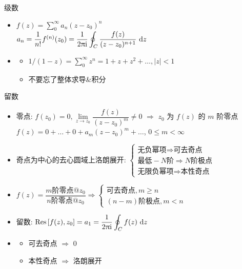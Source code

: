 \documentclass[landscape,a4paper]{ctexart}
\begin{document}
\begin{cheatsheetcolumns}
\begin{card}{级数}
\begin{itemize}
\begin{itemize}
					$\lambda=\lim\limits_{n\to\infty}\dfrac{\left|a_{n+1}\right|}{\left|a_n\right|},\sqrt[n]{a_n};R=\dfrac{1}{\lambda}$
					\item 若为隔项级数 $\sum a_nz^{kn+b}$\\
					$R=\sqrt[k]{R'}$, $R'$ 是对 $a_n$ 使用一般判别法得到的收敛半径
				\end{itemize}
				\item $f(z)=\sum_{0}^{\infty}a_n(z-z_0)^n$\\
				$a_n=\dfrac{1}{n!}f^{(n)}(z_0)=\dfrac{1}{2\uppi\ii}\displaystyle\oint_C\dfrac{f(z)}{(z-z_0)^{n+1}}\,\odif{z}$
				\item 
				\begin{itemize}
					\item $1/(1-z)=\sum_0^\infty z^n=1+z+z^2+\dots,\left|z\right|<1$
					\item 不要忘了整体求导\&积分
				\end{itemize}
			\end{itemize}
		\end{card}
		\begin{card}{留数}
			\begin{itemize}
				\item 零点: $f(z_0)=0,\lim\limits_{z\to z_0}\dfrac{f(z)}{(z-z_0)^m}\neq0$ $\Rightarrow$ $z_0$ 为 $f(z)$ 的 $m$ 阶零点\\
				$f(z)=0+\dots+0+a_m(z-z_0)^m+\dots$, $0\le m< \infty$
				\item 奇点为中心的去心圆域上洛朗展开:
				$
				\begin{cases}
					\text{无负幂项}\Rightarrow \text{可去奇点}\\
					\text{最低} -N \text{阶}\Rightarrow N\text{阶极点}\\
					\text{无限负幂项}\Rightarrow \text{本性奇点}
				\end{cases}
				$
				\item $f(z)=\dfrac{m\text{阶零点}@ z_0}{n\text{阶零点}@ z_0}\Rightarrow\begin{cases}\text{可去奇点},m\ge n\\(n-m)\text{阶极点},m<n\end{cases}$
				\item 留数: $\operatorname{Res}\cc{f(z),z_0}=a_1=\dfrac{1}{2\uppi\ii}\displaystyle\oint_C f(z)\,\odif{z}$
				\item \begin{itemize}
					\item 可去奇点 $\Rightarrow$ $0$
					\item 本性奇点 $\Rightarrow$ 洛朗展开

\end{itemize}
\end{itemize}
\end{card}
\end{cheatsheetcolumns}
\end{document}
